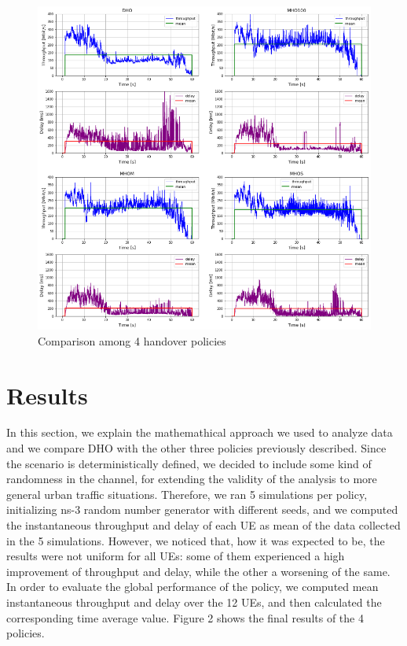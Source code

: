 \documentclass[conference,10pt]{IEEEtran}
\begin{document}
\begin{figure}[h]
	\begin{center}
		\includegraphics[scale=0.85]{images/confronto.png}
		\caption{Comparison among 4 handover policies}
	\end{center}
\end{figure}


\section{Results}\label{sec:res}
In this section, we explain the mathemathical approach we used to analyze data and we compare DHO with the other three policies previously described.
Since the scenario is deterministically defined, we decided to include some kind of randomness in the channel, for extending the validity of the analysis to more general urban traffic situations. Therefore, we ran 5 simulations per policy, initializing ns-3 random number generator with different seeds, and we computed the instantaneous throughput and delay of each UE as mean of the data collected in the 5 simulations. However, we noticed that, how it was expected to be, the results were not uniform for all UEs: some of them experienced a high improvement of throughput and delay, while the other a worsening of the same. In order to evaluate the global performance of the policy, we computed mean instantaneous throughput and delay over the 12 UEs, and then calculated the corresponding time average value.
Figure 2 shows the final results of the 4 policies.
\end{document}
